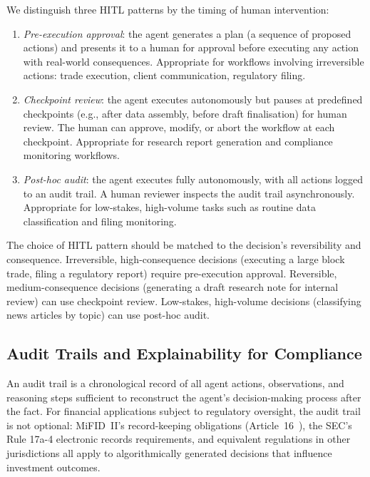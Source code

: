 \begin{context}
We distinguish three HITL patterns by the timing of human intervention:

\begin{enumerate}
  \item \emph{Pre-execution approval}: the agent generates a plan (a sequence of
        proposed actions) and presents it to a human for approval before executing
        any action with real-world consequences. Appropriate for workflows involving
        irreversible actions: trade execution, client communication, regulatory filing.

  \item \emph{Checkpoint review}: the agent executes autonomously but pauses at
        predefined checkpoints (e.g., after data assembly, before draft finalisation)
        for human review. The human can approve, modify, or abort the workflow at each
        checkpoint. Appropriate for research report generation and compliance
        monitoring workflows.

  \item \emph{Post-hoc audit}: the agent executes fully autonomously, with all actions
        logged to an audit trail. A human reviewer inspects the audit trail
        asynchronously. Appropriate for low-stakes, high-volume tasks such as routine
        data classification and filing monitoring.
\end{enumerate}

The choice of HITL pattern should be matched to the decision's reversibility and
consequence. Irreversible, high-consequence decisions (executing a large block trade,
filing a regulatory report) require pre-execution approval. Reversible, medium-consequence
decisions (generating a draft research note for internal review) can use checkpoint
review. Low-stakes, high-volume decisions (classifying news articles by topic) can use
post-hoc audit.


\subsection{Audit Trails and Explainability for Compliance}
\label{subsec:audit}

An audit trail is a chronological record of all agent actions, observations, and
reasoning steps sufficient to reconstruct the agent's decision-making process after the
fact. For financial applications subject to regulatory oversight, the audit trail is
not optional: MiFID~II's record-keeping obligations (Article~16~\citep{esma2018mifid2}), the SEC's
Rule 17a-4 electronic records requirements, and equivalent regulations in other
jurisdictions all apply to algorithmically generated decisions that influence investment
outcomes.


\end{context}
